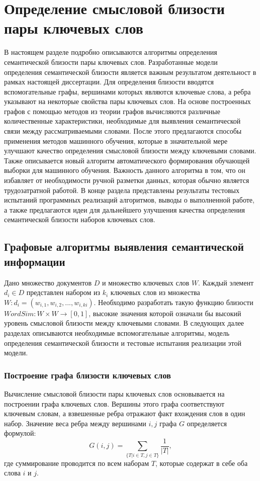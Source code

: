 \chapter{Определение смысловой близости пары ключевых слов} \label{chapt1}
В настоящем разделе подробно описываются алгоритмы определения семантической близости пары ключевых слов. Разработанные модели определения семантической близости является важным результатом деятельност в рамках настоящей диссертации.
Для определения близости вводятся вспомогательные графы, вершинами которых являются ключевые слова, а ребра указывают на некоторые свойства пары ключевых слов.
На основе построенных графов с помощью методов из теории графов вычисляются различные количественные характеристики, необходимые для выявления семантической связи между рассматриваемыми словами.
После этого предлагаются способы применения методов машинного обучения, которые в значительной мере улучшают качество определения смысловой близости между ключевыми словами. 
Также описывается новый алгоритм автоматического формирования обучающей выборки для машинного обучения. Важность данного алгоритма в том, что он избавляет от необходимости ручной разметки данных, которая обычно является трудозатратной работой.
В конце раздела представлены результаты тестовых испытаний программных реализаций алгоритмов, выводы о выполненной работе, а также предлагаются идеи для дальнейшего улучшения качества определения семантической близости наборов ключевых слов.

\section{Графовые алгоритмы выявления семантической информации}
Дано множество документов $D$ и множество ключевых слов $W$. Каждый элемент $d_i \in D$ представлен набором из $k_i$ ключевых слов из множества $W: d_i = (w_{i,1},w_{i,2},...,w_{i,ki})$. Необходимо разработать такую функцию близости $WordSim : W \times W \rightarrow [0, 1]$, высокие значения которой означали бы высокий уровень смысловой близости между ключевыми словами. В следующих далее разделах описываются необходимые вспомогательные алгоритмы, модель определения семантической близости и тестовые испытания реализации этой модели.

\subsection{Построение графа близости ключевых слов} \label{sect1_1}
Вычисление смысловой близости пары ключевых слов основывается на построении графа ключевых слов. Вершины этого графа соответствуют ключевым словам, а взвешенные ребра отражают факт вхождения слов в один набор. Значение веса ребра между вершинами $i, j$ графа $G$ определяется формулой:
$$ G(i, j) = \sum_{\{T|i\in T, j \in T\}}\frac{1}{|T|}, $$
где суммирование проводится по всем наборам $T$, которые содержат в себе оба слова $i$ и $j$.

